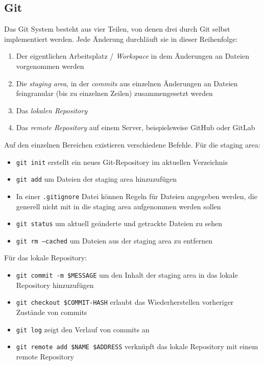 \documentclass[12pt,a4]{article}
\begin{document}
	\subsection{Git}
	Das Git System besteht aus vier Teilen, von denen drei durch Git selbst implementiert werden. Jede Änderung durchläuft sie in dieser Reihenfolge: 
	\begin{enumerate}
		\item Der eigentlichen Arbeitsplatz / \textit{Workspace} in dem Änderungen an Dateien vorgenommen werden
		\item Die \textit{staging area}, in der \textit{commits} aus einzelnen Änderungen an Dateien feingranular (bis zu einzelnen Zeilen) zusammengesetzt werden
		\item Das \textit{lokalen Repository}
		\item Das \textit{remote Repository} auf einem Server, beispielsweise GitHub oder GitLab
	\end{enumerate}
	Auf den einzelnen Bereichen existieren verschiedene Befehle. Für die staging area:
	\begin{itemize}
		\item \texttt{git init} erstellt ein neues Git-Repository im aktuellen Verzeichnis
		\item \texttt{git add} um Dateien der staging area hinzuzufügen
		\item In einer \texttt{.gitignore} Datei können Regeln für Dateien angegeben werden, die generell nicht mit in die staging area aufgenommen werden sollen
		\item \texttt{git status} um aktuell geänderte und getrackte Dateien zu sehen
		\item \texttt{git rm --cached} um Dateien aus der staging area zu entfernen
		
	\end{itemize}
	Für das lokale Repository:
	\begin{itemize}
		\item \texttt{git commit -m \$MESSAGE} um den Inhalt der staging area in das lokale Repository hinzuzufügen
		\item \texttt{git checkout \$COMMIT-HASH} erlaubt das Wiederherstellen vorheriger Zustände von commits
		\item \texttt{git log} zeigt den Verlauf von commits an
		\item \texttt{git remote add \$NAME \$ADDRESS} verknüpft das lokale Repository mit einem remote Repository
	\end{itemize}
\end{document}

